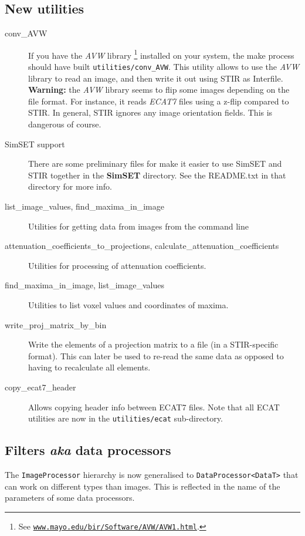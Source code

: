 \documentclass{article}
\def\R2Lurl#1#2{\mbox{\href{#1}{\tt #2}}}
\begin{document}
\subsection{New utilities}
\begin{description}
\item[conv\_AVW]
If you have the \textit{AVW}\texttrademark{} library
\footnote{See \R2Lurl{http://www.mayo.edu/bir/Software/AVW/AVW1.html}{www.mayo.edu/bir/Software/AVW/AVW1.html}.
} installed on your system, the make process should have built \texttt{utilities/conv\_AVW}.
This utility allows to use the \textit{AVW} library to read an image, and then write it out
using STIR as Interfile.\\
\textbf{Warning:} the \textit{AVW} library seems to flip some images depending
on the file format. For instance, it reads \textit{ECAT7} files using a z-flip compared
to STIR. In general, STIR ignores any image orientation fields. This is dangerous of course.
\item[SimSET support]
There are some preliminary files for make it easier to use SimSET and STIR together in the
\textbf{SimSET} directory. See the README.txt in that directory for more info.
\item[list\_image\_values, find\_maxima\_in\_image]
Utilities for getting data from images from the command line
\item[attenuation\_coefficients\_to\_projections, calculate\_attenuation\_coefficients]
Utilities for processing of attenuation coefficients.
\item[find\_maxima\_in\_image, list\_image\_values]
Utilities to list voxel values and coordinates of maxima.
\item[write\_proj\_matrix\_by\_bin]
Write the elements of a projection matrix to a file (in a STIR-specific format).
This can later be used to re-read the same data as opposed to having to recalculate
all elements.
\item[copy\_ecat7\_header]
Allows copying header info between ECAT7 files.
Note that all ECAT utilities are now in the \texttt{utilities/ecat} sub-directory.
\end{description}

\subsection{Filters \textit{aka} data processors}
The \texttt{ImageProcessor} hierarchy is now generalised to 
\texttt{DataProcessor<DataT>} that can work on different types than images. This is reflected
in the name of the parameters of some data processors.
\end{document}
